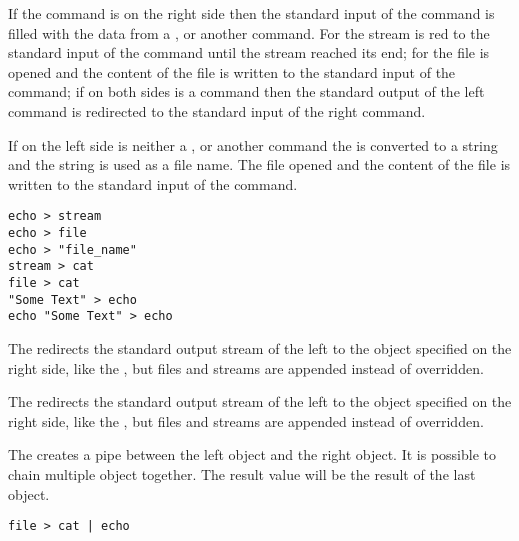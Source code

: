 If the command is on the right side then the standard input of the command
is filled with the data from a \TypeStream, \TypeFile or another command. 
For \TypeStream the stream is red to the standard input of the command until the stream
reached its end; for \TypeFile the file is opened and the content of the file is
written to the standard input of the command; if on both sides is a command
then the standard output of the left command is redirected to the standard
input of the right command.

If on the left side is neither a \TypeStream, \TypeFile or another command
the \TypeGenericObject is converted to a string and the string is used as a
file name. The file opened and the content of the file is written to the
standard input of the command.

\begin{lstlisting}[style=Groovybash, label={lst:example_output_op}, caption={Example \OperatorName >}]
echo > stream
echo > file
echo > "file_name"
stream > cat
file > cat
"Some Text" > echo
echo "Some Text" > echo
\end{lstlisting}

The \TheOperator{<<} redirects the standard output stream of the left to 
the object specified on the right side, like the \TheOperator*{<}, but
files and streams are appended instead of overridden.

The \TheOperator{>>} redirects the standard output stream of
the left to the object specified on the right side, like the \TheOperator*{>}, but
files and streams are appended instead of overridden.

The \TheOperator{|} creates a pipe between the left object and the right object.
It is possible to chain multiple object together. The result value will be the
result of the last object.

\begin{lstlisting}[style=Groovybash, label={lst:example_pipe_op}, caption={Example \OperatorName |}]
file > cat | echo
\end{lstlisting}



